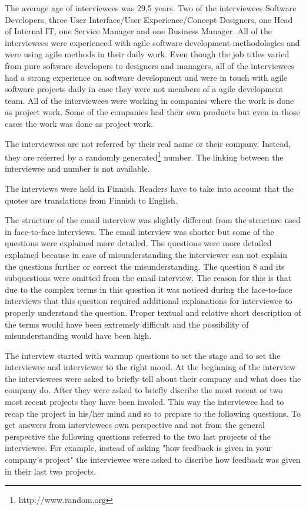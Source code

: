 \documentclass[english,12pt,a4paper,pdftex]{article}
\begin{document}
The average age of interviewees was 29,5 years. Two of the interviewees Software Developers, three User Interface/User Experience/Concept Designers, one Head of Internal IT, one Service Manager and one Business Manager. All of the interviewees were experienced with agile software development methodologies and were using agile methods in their daily work. Even though the job titles varied from pure software developers to designers and managers, all of the interviewees had a strong experience on software development and were in touch with agile software projects daily in case they were not members of a agile development team. All of the interviewees were working in companies where the work is done as project work. Some of the companies had their own products but even in those cases the work was done as project work.

The interviewees are not referred by their real name or their company. Instead, they are referred by a randomly generated\footnote{http://www.random.org} number. The linking between the interviewee and number is not available.

The interviews were held in Finnish. Readers have to take into account that the quotes are translations from Finnish to English.

The structure of the email interview was slightly different from the structure used in face-to-face interviews. The email interview was shorter but some of the questions were explained more detailed. The questions were more detailed explained because in case of misunderstanding the interviewer can not explain the questions further or correct the misunderstanding. The question 8 and its subquestions were omitted from the email interview. The reason for this is that due to the complex terms in this question it was noticed during the face-to-face interviews that this question required additional explanations for interviewee to properly understand the question. Proper textual and relative short description of the terms would have been extremely difficult and the possibility of misunderstanding would have been high. 

The interview started with warmup questions to set the stage and to set the interviewee and interviewer to the right mood. At the beginning of the interview the interviewees were asked to briefly tell about their company and what does the company do. After they were asked to briefly discribe the most recent or two most recent projects they have been involed. This way the interviewee had to recap the project in his/her mind and so to prepare to the following questions. To get answers from interviewees own perspective and not from the general perspective the following questions referred to the two last projects of the interviewee. For example, instead of asking "how feedback is given in your company's project" the interviewee were asked to discribe how feedback was given in their last two projects.
\end{document}
